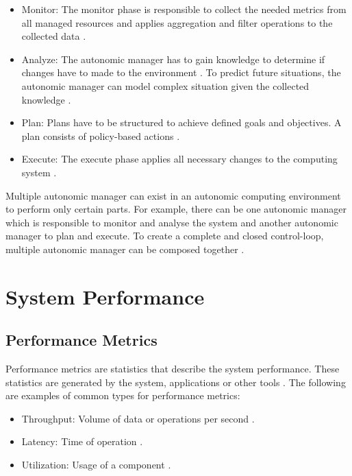 \begin{itemize}
\item Monitor:
The monitor phase is responsible to collect the needed metrics from all managed resources and applies aggregation and filter operations to the collected data \cite{Sinreich2006AnAB}.

\item Analyze:
The autonomic manager has to gain knowledge to determine if changes have to made to the environment \cite{Sinreich2006AnAB}. To predict future situations, the autonomic manager can model complex situation given the collected knowledge \cite{Jacob2004AutonomicSolution}.

\item Plan:
Plans have to be structured to achieve defined goals and objectives. A plan consists of policy-based actions \cite{Jacob2004AutonomicSolution, Sinreich2006AnAB}.

\item Execute:
The execute phase applies all necessary changes to the computing system \cite{Sinreich2006AnAB}.
\end{itemize}

Multiple autonomic manager can exist in an autonomic computing environment to perform only certain parts. For example, there can be one autonomic manager which is responsible to monitor and analyse the system and another autonomic manager to plan and execute. To create a complete and closed control-loop, multiple autonomic manager can be composed together \cite{Sinreich2006AnAB}.


\section{System Performance}


\subsection{Performance Metrics}
Performance metrics are statistics that describe the system performance. These statistics are generated by the system, applications or other tools \cite{Greg2020SysPerf}.
The following are examples of common types for performance metrics:
\begin{itemize}
\item Throughput: Volume of data or operations per second \cite{Greg2020SysPerf}.
\item Latency: Time of operation \cite{Greg2020SysPerf}.
\item Utilization: Usage of a component \cite{Greg2020SysPerf}.
\end{itemize}



